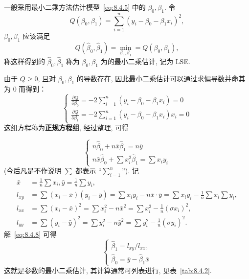 一般采用最小二乘方法估计模型~\ref{eq:8.4.5} 中的 $\beta_0, \beta_1$. 令
\begin{equation*}
  Q(\beta_{0}, \beta_{1}) = \sum_{i=1}^{n} (y_{i} - \beta_{0} - \beta_{1} x_{i})^{2},
\end{equation*}
$\beta_0,\beta_1$ 应该满足
\begin{equation*}
  Q(\hat{\beta}_{0}, \hat{\beta}_{1}) =\min_{\beta_0, \beta_1} = Q(\beta_0, \beta_1),
\end{equation*}
称这样得到的 $\hat{\beta}_0, \hat{\beta}_1$ 称为 $\beta_0, \beta_1$ 为的最小二乘估计, 记为 LSE.

由于 $Q \ge 0$, 且对 $\beta_0, \beta_1$ 的导数存在, 因此最小二乘估计可以通过求偏导数并命其为 $0$ 而得到：
\begin{equation}\label{eq:8.4.7}
	\begin{cases}
	  \frac{\partial Q}{\partial \beta_{0}} = -2 \sum_{i=1}^{n}(y_{i} - \beta_{0} - \beta_{1} x_{i})=0 \\
		\frac{\partial Q}{\partial \beta_{1}} = -2 \sum_{i=1}^{n}(y_{i} - \beta_{0} - \beta_{1} x_{i}) x_{i}=0
	\end{cases}
\end{equation}
这组方程称为\textbf{正规方程组}, 经过整理, 可得

\begin{equation}\label{eq:8.4.8}
	\begin{cases}
		n \hat{\beta}_{0} + n \bar{x} \hat{\beta}_{1} = n \bar{y} \\
		n \bar{x} \hat{\beta}_{0} + \sum x_{i}^{2} \hat{\beta}_{1} = \sum x_{i} y_{i}
	\end{cases}
\end{equation}
(今后凡是不作说明 $\sum$ 都表示 “$\sum_{i=1}^{n}$”). 记
\begin{equation*}
  \begin{split}
  \bar{x} & = \frac{1}{n}\sum x_{i}, \bar{y} = \frac{1}{n}\sum y_{i},\\
  l_{xy}  & =\sum(x_{i} - \bar{x}) (y_{i} - \bar{y}) =\sum x_{i} y_{i} - n \bar{x} \cdot \bar{y} =\sum x_{i} y_{i} - \frac{1}{n}\sum x_{i}\sum y_{i},\\
  l_{xx}  & =\sum(x_{i} - \bar{x})^{2} =\sum x_{i}^{2} - n \bar{x}^{2} =\sum x_{i}^{2} - \frac{1}{n}(\sigma x_{i})^{2}, \\
  l_{y y} & =\sum(y_{i} - \bar{y})^{2} =\sum y_{i}^{2} - n \bar{y}^{2} =\sum y_{i}^{2} - \frac{1}{n}(\sigma y_{i})^{2}.
  \end{split}
\end{equation*}
解~\ref{eq:8.4.8} 可得
\begin{equation}\label{eq:8.4.9}
  \begin{cases}
    \hat{\beta}_{1} = l_{xy}/l_{xx}, \\
    \hat{\beta}_{0} = \bar{y} - \hat{\beta}_{1} \bar{x}
  \end{cases}
\end{equation}
这就是参数的最小二乘估计, 其计算通常可列表进行, 见表~\ref{tab:8.4.2}.

